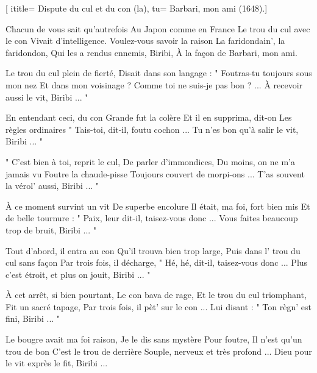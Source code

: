  [
ititle= {Dispute du cul et du con (la)},
tu= {Barbari, mon ami (1648).}]

\beginverse
Chacun de vous sait qu'autrefois
Au Japon comme en France
Le trou du cul avec le con
Vivait d'intelligence.
Voulez-vous savoir la raison
La faridondain', la faridondon,
Qui les a rendus ennemis, Biribi,
À la façon de Barbari, mon ami.
\endverse

\beginverse
Le trou du cul plein de fierté,
Disait dans son langage :
" Foutras-tu toujours sous mon nez
Et dans mon voisinage ?
Comme toi ne suis-je pas bon ? ...
À recevoir aussi le vit, Biribi ... "
\endverse

\beginverse
En entendant ceci, du con
Grande fut la colère
Et il en supprima, dit-on
Les règles ordinaires
" Tais-toi, dit-il, foutu cochon ...
Tu n'es bon qu'à salir le vit, Biribi ... "
\endverse

\beginverse
" C'est bien à toi, reprit le cul,
De parler d'immondices,
Du moins, on ne m'a jamais vu
Foutre la chaude-pisse
Toujours couvert de morpi-ons ...
T'as souvent la vérol' aussi, Biribi ... "
\endverse

\beginverse
À ce moment survint un vit
De superbe encolure
Il était, ma foi, fort bien mis
Et de belle tournure :
" Paix, leur dit-il, taisez-vous donc ...
Vous faites beaucoup trop de bruit, Biribi ... "
\endverse

\beginverse
Tout d'abord, il entra au con
Qu'il trouva bien trop large,
Puis dans l' trou du cul sans façon
Par trois fois, il décharge,
" Hé, hé, dit-il, taisez-vous donc ...
Plus c'est étroit, et plus on jouit, Biribi ... "
\endverse

\beginverse
À cet arrêt, si bien pourtant,
Le con bava de rage,
Et le trou du cul triomphant,
Fit un sacré tapage,
Par trois fois, il pèt' sur le con ...
Lui disant : " Ton règn' est fini, Biribi ... "
\endverse

\beginverse
Le bougre avait ma foi raison,
Je le dis sans mystère
Pour foutre, Il n'est qu'un trou de bon
C'est le trou de derrière
Souple, nerveux et très profond ...
Dieu pour le vit exprès le fit, Biribi ...
\endverse

\endsong